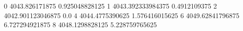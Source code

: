 0 4043.826171875 0.925048828125
1 4043.392333984375 0.4912109375
2 4042.901123046875 0.0
4 4044.4775390625 1.576416015625
6 4049.62841796875 6.727294921875
8 4048.1298828125 5.228759765625
